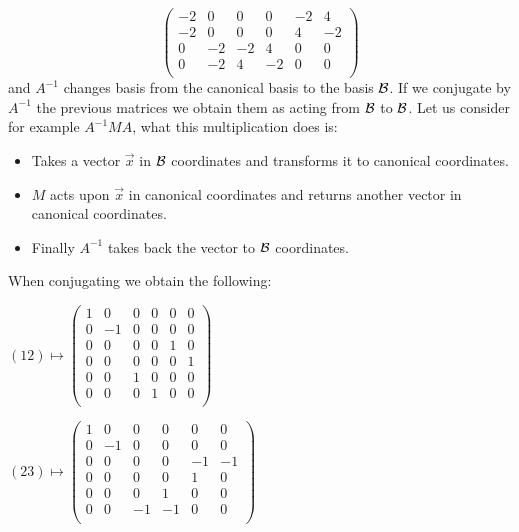 \documentclass[12pt]{memoir}
\begin{document}
\begin{ptcbr}
$$\begin{pmatrix}
         -2 & 0 & 0 & 0 & -2 & 4 \\
         -2 & 0 & 0 & 0 & 4 & -2 \\
         0 & -2 & -2 & 4 & 0 & 0 \\
         0 & -2 & 4 & -2 & 0 & 0 \\
        \end{pmatrix}$$
    and $A^{-1}$ changes basis from the canonical basis to the basis $\mathcal{B}$. If we conjugate by $A^{-1}$ the previous matrices we obtain them as acting from $\mathcal{B}$ to $\mathcal{B}$. Let us consider for example $A^{-1}MA$, what this multiplication does is:
    \begin{itemize}
        \itemsep=-0.4em
        \item Takes a vector $\vec x$ in $\mathcal{B}$ coordinates and transforms it to canonical coordinates.
        \item $M$ acts upon $\vec x$ in canonical coordinates and returns another vector in canonical coordinates.
        \item Finally $A^{-1}$ takes back the vector to $\mathcal{B}$ coordinates.
    \end{itemize}
When conjugating we obtain the following:
\begin{itemize}
    \begin{multicols*}{2}
        \item $(12)\mapsto \begin{pmatrix}
             1 & 0 & 0 & 0 & 0 & 0 \\
             0 & -1 & 0 & 0 & 0 & 0 \\
             0 & 0 & 0 & 0 & 1 & 0 \\
             0 & 0 & 0 & 0 & 0 & 1 \\
             0 & 0 & 1 & 0 & 0 & 0 \\
             0 & 0 & 0 & 1 & 0 & 0 \\
            \end{pmatrix}$
        \item $(23)\mapsto\begin{pmatrix}
             1 & 0 & 0 & 0 & 0 & 0 \\
             0 & -1 & 0 & 0 & 0 & 0 \\
             0 & 0 & 0 & 0 & -1 & -1 \\
             0 & 0 & 0 & 0 & 1 & 0 \\
             0 & 0 & 0 & 1 & 0 & 0 \\
             0 & 0 & -1 & -1 & 0 & 0 \\
            \end{pmatrix}$

\end{multicols*}
\end{itemize}
\end{ptcbr}
\end{document}
